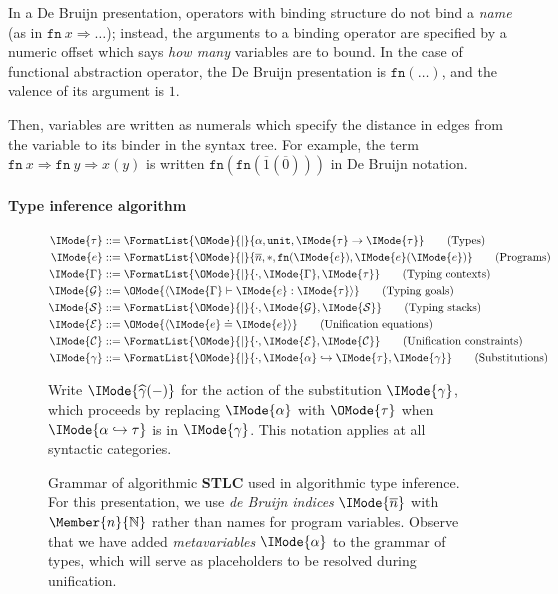 \documentclass[twocolumn,9pt]{article}
\theoremstyle{definition}
\theoremstyle{remark}
\numberwithin{equation}{section}
\newcommand\Nat{\mathbb{N}}
\newcommand\STLC{{\sffamily\bfseries{}STLC}}
\newcommand\Nil{*}
\newcommand\Fn[2]{\mathtt{fn}\ {#1}\Rightarrow{#2}}
\newcommand\DBFn[1]{\mathtt{fn} (#1)}
\newcommand\TyUnit{\mathtt{unit}}
\newcommand\TyArr[2]{#1\to{#2}}
\newcommand\Var[1]{\overline{#1}}
\newcommand\MkGoal[3]{\langle{#1}\vdash{#2}:{#3}\rangle}
\newcommand\MkEq[2]{\langle{#1}\doteq{#2}\rangle}
\newcommand\Subst[2]{\widehat{#1} (#2)}
\begin{document}
In a De Bruijn presentation, operators with binding structure do not
bind a \emph{name} (as in $\Fn{x}{\ldots}$); instead, the arguments to
a binding operator are specified by a numeric offset which says
\emph{how many} variables are to bound. In the case of functional
abstraction operator, the De Bruijn presentation is $\DBFn{\ldots}$,
and the valence of its argument is $1$.

Then, variables are written as numerals which specify the distance in
edges from the variable to its binder in the syntax tree. For
example, the term $\Fn{x}{\Fn{y}{x(y)}}$ is written
$\DBFn{\DBFn{\overline{1}(\overline{0})}}$ in De Bruijn notation.

\paragraph{Type inference algorithm}



\begin{figure*}
  \begin{align*}
    \IMode{\tau} &::= \FormatList{\OMode}{\mid}{\alpha, \TyUnit,\TyArr{\IMode{\tau}}{\IMode{\tau}}}
    \tag{Types}
    \\
    \IMode{e} &::= \FormatList{\OMode}{\mid}{\Var{n}, \Nil, \DBFn{\IMode{e}}, \IMode{e}(\IMode{e})}
    \tag{Programs}
    \\
    \IMode{\Gamma} &::= \FormatList{\OMode}{\mid}{\cdot,{\IMode{\Gamma},\IMode{\tau}}}
    \tag{Typing contexts}
    \\
    \IMode{\mathcal{G}} &::= \OMode{\MkGoal{\IMode{\Gamma}}{\IMode{e}}{\IMode{\tau}}}
    \tag{Typing goals}
    \\
    \IMode{\mathcal{S}} &::= \FormatList{\OMode}{\mid}{\cdot, {\IMode{\mathcal{G}},\IMode{\mathcal{S}}}}
    \tag{Typing stacks}
    \\
    \IMode{\mathcal{E}} &::= \OMode{\MkEq{\IMode{e}}{\IMode{e}}}
    \tag{Unification equations}
    \\
    \IMode{\mathcal{C}} &::= \FormatList{\OMode}{\mid}{\cdot,{\IMode{\mathcal{E}},\IMode{\mathcal{C}}}}
    \tag{Unification constraints}
    \\
    \IMode{\gamma} &::= \FormatList{\OMode}{\mid}{\cdot, {\IMode{\alpha}\hookrightarrow\IMode{\tau},\IMode{\gamma}}}
    \tag{Substitutions}
  \end{align*}

  Write $\IMode{\Subst{\gamma}{-}}$ for the action of the substitution
  $\IMode{\gamma}$, which proceeds by replacing $\IMode{\alpha}$ with
  $\OMode{\tau}$ when $\IMode{\alpha\hookrightarrow\tau}$ is in
  $\IMode{\gamma}$. This notation applies at all syntactic categories.

  \caption{Grammar of algorithmic \STLC{} used in algorithmic type
    inference.  For this presentation, we use \emph{de Bruijn indices}
    $\IMode{\Var{n}}$ with $\Member{n}{\Nat}$ rather than names for
    program variables. Observe that we have added \emph{metavariables}
    $\IMode{\alpha}$ to the grammar of types, which will serve as
    placeholders to be resolved during unification.
  }\label{fig:stlc-algorithmic-grammar}
\end{figure*}
\end{document}
